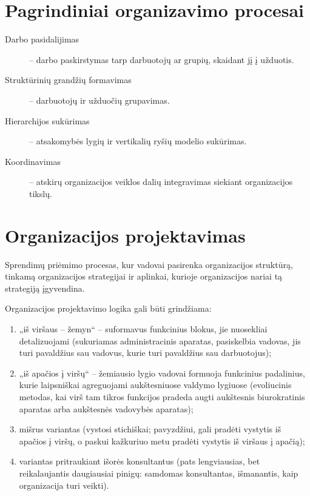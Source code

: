 \section{Pagrindiniai organizavimo procesai}

\begin{description}
  \item[Darbo pasidalijimas] – darbo paskirstymas tarp darbuotojų ar
    grupių, skaidant jį į užduotis.
  \item[Struktūrinių grandžių formavimas] – darbuotojų ir
    užduočių grupavimas.
  \item[Hierarchijos sukūrimas] – atsakomybės lygių ir vertikalių
    ryšių modelio sukūrimas.
  \item[Koordinavimas] – atskirų organizacijos veiklos dalių integravimas
    siekiant organizacijos tikslų.
\end{description}

\section{Organizacijos projektavimas}

\begin{defn}
  Sprendimų priėmimo procesas, kur vadovai pasirenka organizacijos
  struktūrą, tinkamą organizacijos strategijai ir aplinkai, kurioje
  organizacijos nariai tą strategiją įgyvendina.
\end{defn}

Organizacijos projektavimo logika gali būti grindžiama:
\begin{enumerate}
  \item „iš viršaus – žemyn“ – suformavus funkcinius blokus, jie
    nuosekliai detalizuojami (sukuriamas administracinis aparatas,
    pasiskelbia vadovas, jis turi pavaldžius sau vadovus, kurie
    turi pavaldžius sau darbuotojus);
  \item „iš apačios į viršų“ – žemiausio lygio vadovai formuoja
    funkcinius padalinius, kurie laipsniškai agreguojami aukštesniuose
    valdymo lygiuose (evoliucinis metodas, kai virš tam tikros funkcijos
    pradeda augti aukštesnis biurokratinis aparatas arba aukštesnės
    vadovybės aparatas);
  \item mišrus variantas (vystosi stichiškai; pavyzdžiui, gali pradėti
    vystytis iš apačios į viršų, o paskui kažkuriuo metu pradėti vystytis
    iš viršaus į apačią);
  \item variantas pritraukiant išorės konsultantus (pats lengviausias,
    bet reikalaujantis daugiausiai pinigų: samdomas konsultantas, 
    išmanantis, kaip organizacija turi veikti).
\end{enumerate}

